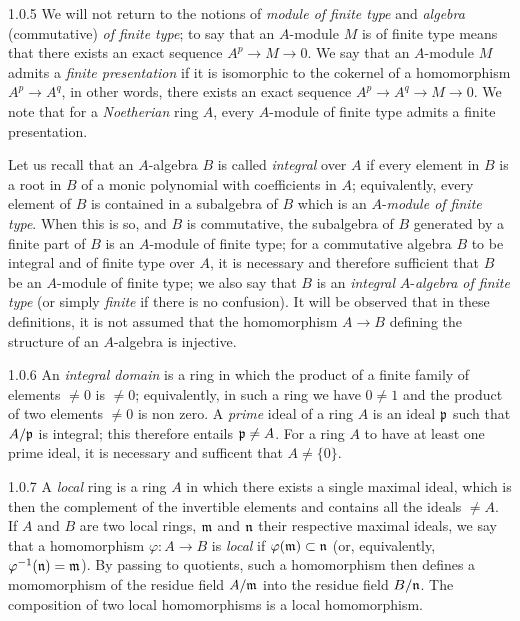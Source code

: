 \documentclass[../main.tex]{subfiles}
\begin{document}
\begin{env}{1.0.5}
We will not return to the notions of \emph{module of finite type} and
\emph{algebra} (commutative) \emph{of finite type}; to say that an $A$-module $M$
is of finite type means that there exists an exact sequence $A^p\to M\to 0$. We say that
an $A$-module $M$ admits a \emph{finite presentation} if it is isomorphic to the cokernel
of a homomorphism $A^p\to A^q$, in other words, there exists an exact sequence
$A^p\to A^q\to M\to 0$. We note that for a \emph{Noetherian} ring $A$, every $A$-module
of finite type admits a finite presentation.

Let us recall that an $A$-algebra $B$ is called \emph{integral} over $A$ if every element
in $B$ is a root in $B$ of a monic polynomial with coefficients in $A$; equivalently, every
element of $B$ is contained in a subalgebra of $B$ which is an $A$-\emph{module of finite type}.
When this is so, and $B$ is commutative, the subalgebra of $B$ generated by a finite part of
$B$ is an $A$-module of finite type; for a commutative algebra $B$ to be integral and of finite
type over $A$, it is necessary and therefore sufficient that $B$ be an $A$-module of finite
type; we also say that $B$ is an \emph{integral} $A$-\emph{algebra of finite type} (or
simply \emph{finite} if there is no confusion). It will be observed that in these definitions,
it is not assumed that the homomorphism $A\to B$ defining the structure of an $A$-algebra
is injective.
\end{env}

\begin{env}{1.0.6}
An \emph{integral domain} is a ring in which the product of a finite family of elements
$\neq 0$ is $\neq 0$; equivalently, in such a ring we have $0\neq 1$ and the product of
two elements $\neq 0$ is non zero. A \emph{prime} ideal of a ring $A$ is an ideal $\mathfrak{p}$
such that $A/\mathfrak{p}$ is integral; this therefore entails $\mathfrak{p}\neq A$. For a ring $A$ to
have at least one prime ideal, it is necessary and sufficent that $A\neq\{0\}$.
\end{env}

\begin{env}{1.0.7}
A \emph{local} ring is a ring $A$ in which there exists a single maximal ideal, which is then
the complement of the invertible elements and contains all the ideals $\neq A$. If $A$ and $B$
are two local rings, $\mathfrak{m}$ and $\mathfrak{n}$ their respective maximal ideals, we say that a
homomorphism $\varphi:A\to B$ is \emph{local} if $\varphi(\mathfrak{m})\subset\mathfrak{n}$ (or, equivalently,
$\varphi^{-1}(\mathfrak{n})=\mathfrak{m}$). By passing to quotients, such a homomorphism then defines
a momomorphism of the residue field $A/\mathfrak{m}$ into the residue field $B/\mathfrak{n}$. The
composition of two local homomorphisms is a local homomorphism.
\end{env}
\end{document}

